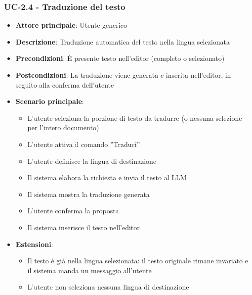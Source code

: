 \documentclass[11pt,a4paper]{article}
\begin{document}
\subsubsection{UC-2.4 - Traduzione del testo}
\begin{itemize}
    \item \textbf{Attore principale}: Utente generico
    \item \textbf{Descrizione}: Traduzione automatica del testo nella lingua selezionata
    \item \textbf{Precondizioni}: È presente testo nell’editor (completo o selezionato)
    \item \textbf{Postcondizioni}: La traduzione viene generata e inserita nell'editor, in seguito alla conferma dell'utente
    \item \textbf{Scenario principale}:
    \begin{itemize}
        \item L’utente seleziona la porzione di testo da tradurre (o nessuna selezione per l'intero documento)
        \item L’utente attiva il comando ”Traduci”
        \item L’utente definisce la lingua di destinazione
        \item Il sistema elabora la richiesta e invia il testo al LLM
        \item Il sistema mostra la traduzione generata
        \item L'utente conferma la proposta
        \item Il sistema inserisce il testo nell'editor
    \end{itemize}
    \item \textbf{Estensioni}:
    \begin{itemize}
        \item Il testo è già nella lingua selezionata: il testo originale rimane invariato e il sistema manda un messaggio all’utente
        \item L’utente non seleziona nessuna lingua di destinazione
    \end{itemize}
\end{itemize}
\end{document}
